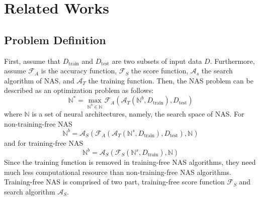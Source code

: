 \documentclass[sigconf]{acmart}
\begin{document}
    \section{Related Works}
    \label{sec:related_work}

    \subsection{Problem Definition}
    First, assume that $D_{\text{train}}$ and $D_{\text{test}}$ are two subsets of input data $D$. Furthermore, 
    assume $\mathcal F_A$ is the accuracy function, $\mathcal F_S$ the score function, $\mathcal A_s$ the 
    search algorithm of NAS, and $\mathcal A_T$ the training function. Then, the NAS problem can be 
    described as an optimization problem as follows: 
    \begin{equation}
        \label{equ:nas}
        \mathbb N^*=\max_{\mathbb N^b\in\mathbb N}\mathcal F_A(\mathcal A_T(\mathbb N^b, D_{\text{train}}), D_{\text{test}})
    \end{equation}
    where $\mathbb N$ is a set of neural architectures, namely, the search space of NAS. 
    For non-training-free NAS 
    \begin{equation}
        \label{equ:non-training_free_nas}
        \mathbb N^b=\mathcal A_S(\mathcal F_A(\mathcal A_T(\mathbb N^s, D_{\text{train}}), D_{\text{test}}), \mathbb N)
    \end{equation}
    and for training-free NAS 
    \begin{equation}
        \label{equ:training_free_nas}
        \mathbb N^b=\mathcal A_S(\mathcal F_S(\mathbb N^s, D_{\text{train}}), \mathbb N)
    \end{equation}
    Since the training function is removed in training-free NAS algorithms, they need much less 
    computational resource than non-training-free NAS algorithms. 
    Training-free NAS is comprised of two part, training-free score function $\mathcal F_S$ and 
    search algorithm $\mathcal A_S$. 
\end{document}
